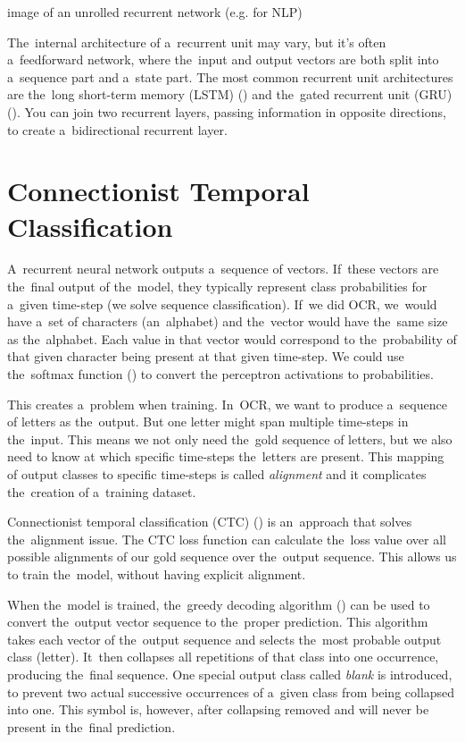 \begin{code}
image of an unrolled recurrent network (e.g. for NLP)
\end{code}

The~internal architecture of a~recurrent unit may vary, but it's often a~feedforward network, where the~input and output vectors are both split into a~sequence part and a~state part. The most common recurrent unit architectures are the~long short-term memory (LSTM) (\cite{LSTM}) and the~gated recurrent unit (GRU) (\cite{GRU}). You can join two recurrent layers, passing information in opposite directions, to create a~bidirectional recurrent layer.


\section{Connectionist Temporal Classification}

A~recurrent neural network outputs a~sequence of vectors. If~these vectors are the~final output of the~model, they typically represent class probabilities for a~given time-step (we solve sequence classification). If~we did OCR, we~would have a~set of characters (an~alphabet) and the~vector would have the~same size as the~alphabet. Each value in that vector would correspond to the~probability of that given character being present at that given time-step. We could use the~softmax function (\cite{Goodfellow-et-al-2016}) to convert the perceptron activations to probabilities.

This creates a~problem when training. In~OCR, we want to produce a~sequence of letters as the~output. But one letter might span multiple time-steps in the~input. This means we not only need the~gold sequence of letters, but we also need to know at which specific time-steps the~letters are present. This mapping of output classes to specific time-steps is called \emph{alignment} and it complicates the~creation of a~training dataset.

Connectionist temporal classification (CTC) (\cite{CTC}) is an~approach that solves the~alignment issue. The CTC loss function can calculate the~loss value over all possible alignments of our gold sequence over the~output sequence. This allows us to train the~model, without having explicit alignment.

When the~model is trained, the~greedy decoding algorithm (\cite{CTC}) can be used to convert the~output vector sequence to the~proper prediction. This algorithm takes each vector of the~output sequence and selects the~most probable output class (letter). It~then collapses all repetitions of that class into one occurrence, producing the~final sequence. One special output class called \emph{blank} is introduced, to prevent two actual successive occurrences of a~given class from being collapsed into one. This symbol is, however, after collapsing removed and will never be present in the~final prediction.

